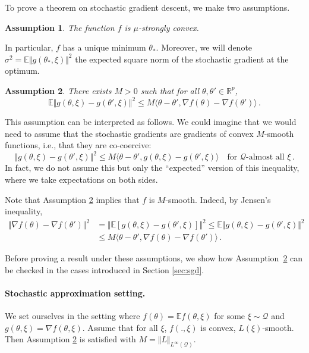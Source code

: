 \documentclass[11pt,reqno]{article}
\newcommand{\E}{\mathbb{E}}
\newcommand{\R}{\mathbb{R}}
\newcommand{\cQ}{\mathcal{Q}}
\renewcommand{\leq}{\leqslant}
\numberwithin{equation}{section}
\theoremstyle{plain}
\newtheorem{assumption}{Assumption}[section]
\theoremstyle{definition}
\theoremstyle{remark}
\begin{document}
To prove a theorem on stochastic gradient descent, we make two assumptions.

\begin{assumption}
	\label{assu:strong-convexity}
The function $f$ is $\mu$-strongly convex. 
\end{assumption}

In particular, $f$ has a unique minimum $\theta_*$. Moreover, we will denote $\sigma^2 = \E\Vert g(\theta_*, \xi)\Vert^2$ the expected square norm of the stochastic gradient at the optimum.

\begin{assumption}
	\label{assu:cocoercivity-grad-sto}
	There exists $M>0$ such that for all $\theta, \theta' \in \R^p$,
	\begin{equation*}
		\E\Vert g(\theta, \xi) - g(\theta', \xi)\Vert^2  \leq M \langle \theta - \theta' , \nabla f(\theta) - \nabla f(\theta') \rangle \, .
	\end{equation*}
\end{assumption}

This assumption can be interpreted as follows. We could imagine that we would need to assume that the stochastic gradients are gradients of convex $M$-smooth functions, i.e., that they are co-coercive:
\begin{equation*}
	\Vert g(\theta, \xi) - g(\theta', \xi) \Vert^2 \leq M \langle \theta - \theta', g(\theta, \xi) - g(\theta', \xi) \rangle \quad \text{for $\cQ$-almost all $\xi$}\, .
\end{equation*}
In fact, we do not assume this but only the ``expected'' version of this inequality, where we take expectations on both sides.

Note that Assumption \ref{assu:cocoercivity-grad-sto} implies that $f$ is $M$-smooth. Indeed, by Jensen's inequality, 
\begin{align*}
	\Vert \nabla f(\theta) - \nabla f(\theta') \Vert^2 &= \Vert \E\left[g(\theta, \xi) - g(\theta', \xi)\right] \Vert^2 \leq \E\Vert g(\theta, \xi) - g(\theta', \xi)\Vert^2 \\
	&\leq M \langle \theta - \theta' , \nabla f(\theta) - \nabla f(\theta') \rangle \, .
\end{align*}

Before proving a result under these assumptions, we show how Assumption~\ref{assu:cocoercivity-grad-sto} can be checked in the cases introduced in Section \ref{sec:sgd}.

\paragraph{Stochastic approximation setting.} We set ourselves in the setting where $f(\theta) = \E f(\theta, \xi)$ for some $\xi \sim \cQ$ and $g(\theta, \xi) = \nabla f(\theta, \xi)$. Assume that for all $\xi$, $f(.,\xi)$ is convex, $L(\xi)$-smooth. Then Assumption \ref{assu:cocoercivity-grad-sto} is satisfied with $M = \Vert L \Vert_{L^\infty(\cQ)}$.
\end{document}
